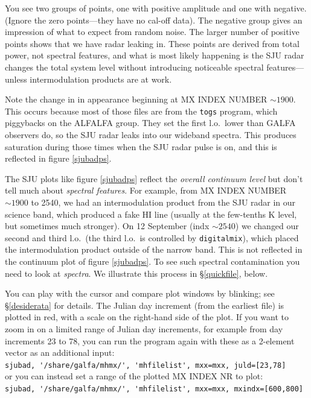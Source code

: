 \documentclass[psfig,preprint]{aastex}
\begin{document}
	You see two groups of points, one with positive amplitude and
one with negative.  (Ignore the zero points---they have no cal-off
data).  The negative group gives an impression of what to expect from
random noise.  The larger number of positive points shows that we have radar
leaking in.  These points are derived from total power, not spectral
features, and what is most likely happening is the SJU radar changes the
total system level without introducing noticeable spectral
features---unless intermodulation products are at work. 

	Note the change in in appearance beginning at MX INDEX NUMBER
$\sim 1900$. This occurs because most of those files are from the
\verb$togs$ program, which piggybacks on the ALFALFA group. They set the
first l.o.\ lower than GALFA observers do, so the SJU radar leaks into
our wideband spectra. This produces saturation during those times when
the SJU radar pulse is on, and this is reflected in figure
\ref{sjubadps}. 

	The SJU plots like figure \ref{sjubadps} reflect the {\it
overall continuum level} but don't tell much about {\it spectral
features}.  For example, from MX INDEX NUMBER $\sim 1900$ to 2540, we
had an intermodulation product from the SJU radar in our science band,
which produced a fake HI line (usually at the few-tenths K level, but
sometimes much stronger).  On 12 September (indx $\sim 2540$) we changed
our second and third l.o.\ (the third l.o.\ is controlled by
\verb$digitalmix$), which placed the intermodulation product outside of
the narrow band.  This is not reflected in the continuum plot of figure
\ref{sjubadps}.  To see such spectral contamination you need to look at
{\it spectra}.  We illustrate this process in \S \ref{quickfile}, below. 

		You can play with the cursor and compare plot windows by
blinking; see \S \ref{desiderata} for details.  
The Julian day increment (from the earliest file) is plotted in
red, with a scale on the right-hand side of the plot. If you want to
zoom in on a limited range of Julian day increments, for example from
day increments 23 to 78, you can run the program again with these as a
2-element vector as an additional input: \\
\verb$sjubad, '/share/galfa/mhmx/', 'mhfilelist', mxx=mxx, juld=[23,78]$ \\
or you can instead set a range of the plotted MX INDEX NR to plot: \\
\verb$sjubad, '/share/galfa/mhmx/', 'mhfilelist', mxx=mxx, mxindx=[600,800]$ 
\end{document}
